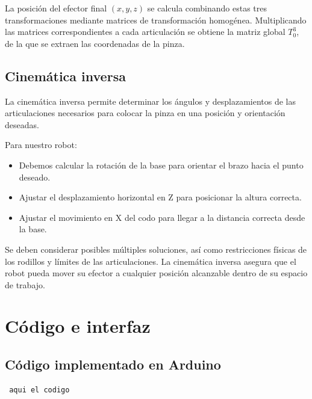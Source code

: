 \documentclass[11pt]{article}
\begin{document}
La posición del efector final $(x,y,z)$ se calcula combinando estas tres transformaciones mediante matrices de transformación homogénea. Multiplicando las matrices correspondientes a cada articulación se obtiene la matriz global $T_0^3$, de la que se extraen las coordenadas de la pinza.

\subsection{Cinemática inversa}
La cinemática inversa permite determinar los ángulos y desplazamientos de las articulaciones necesarios para colocar la pinza en una posición y orientación deseadas.

Para nuestro robot:
\begin{itemize}
    \item Debemos calcular la rotación de la base para orientar el brazo hacia el punto deseado.
    \item Ajustar el desplazamiento horizontal en Z para posicionar la altura correcta.
    \item Ajustar el movimiento en X del codo para llegar a la distancia correcta desde la base.

\end{itemize}


Se deben considerar posibles múltiples soluciones, así como restricciones físicas de los rodillos y límites de las articulaciones. La cinemática inversa asegura que el robot pueda mover su efector a cualquier posición alcanzable dentro de su espacio de trabajo.


\section{Código e interfaz}
\label{sec:código}



\subsection{Código implementado en Arduino}
\begin{lstlisting}
 aqui el codigo
\end{lstlisting}
\end{document}
